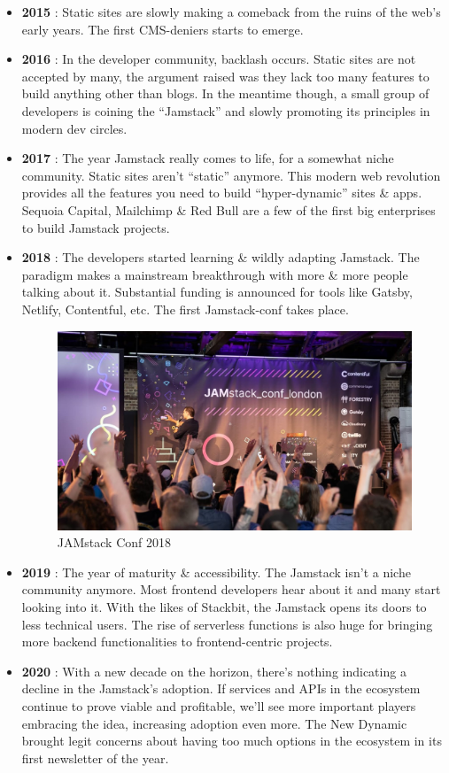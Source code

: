 \documentclass[12pt,a4paper,oneside]{report}
\begin{document}
\begin{itemize}
\item  \textbf{2015} : Static sites are slowly making a comeback from the ruins of the web’s early years. The first CMS-deniers starts to emerge.
\item \textbf{2016} : In the developer community, backlash occurs. Static sites are not accepted by many, the argument raised was they lack too many features to build anything other than blogs. In the meantime though, a small group of developers is coining the “Jamstack” and slowly promoting its principles in modern dev circles.
\item \textbf{2017} : The year Jamstack really comes to life, for a somewhat niche community. Static sites aren't “static” anymore. This modern web revolution provides all the features you need to build “hyper-dynamic” sites \& apps. Sequoia Capital, Mailchimp \& Red Bull are a few of the first big enterprises to build Jamstack projects.
\item \textbf{2018} : The developers started learning \&  wildly adapting Jamstack. The paradigm makes a mainstream breakthrough with more \& more people talking about it. Substantial funding is announced for tools like Gatsby, Netlify, Contentful, etc. The first Jamstack\--conf takes place.

\begin{figure}[H]
    \centering
    \includegraphics[scale=.2]{images/jam-conf-2018.jpg}
    \caption{JAMstack Conf 2018\cite{conf}}
\end{figure}

\item  \textbf{2019} : The year of maturity \& accessibility. The Jamstack isn’t a niche community anymore. Most frontend developers hear about it and many start looking into it. With the likes of Stackbit, the Jamstack opens its doors to less technical users. The rise of serverless functions is also huge for bringing more backend functionalities to frontend-centric projects.
\item \textbf{2020} : With a new decade on the horizon, there’s nothing indicating a decline in the Jamstack’s adoption. If services and APIs in the ecosystem continue to prove viable and profitable, we’ll see more important players embracing the idea, increasing adoption even more. The New Dynamic brought legit concerns about having too much options in the ecosystem in its first newsletter of the year. 
\end{itemize}
\end{document}
